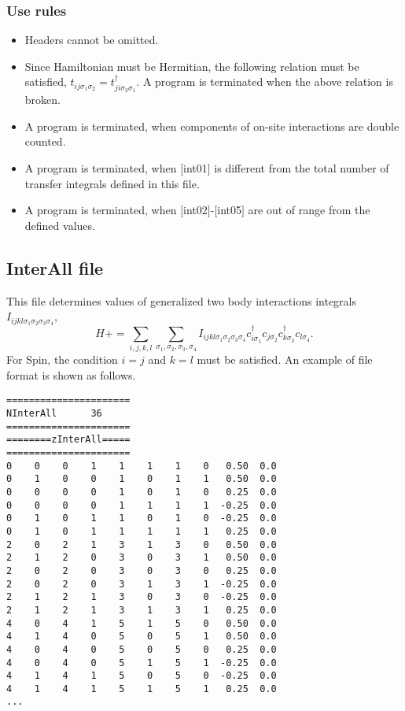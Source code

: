 \subsubsection{Use rules}
\begin{itemize}
\item Headers cannot be omitted. 
\item Since Hamiltonian must be Hermitian, the following relation must be satisfied, $t_{ij\sigma_1\sigma_2}=t_{ji\sigma_2\sigma_1}^{\dagger}$. A program is terminated when the above relation is broken.
\item A program is terminated, when components of on-site interactions are double counted.
\item A program is terminated, when $[$int01$]$ is different from the total number of transfer integrals defined in this file.
\item A program is terminated, when $[$int02$]$-$[$int05$]$ are out of range from the defined values.
\end{itemize}

\newpage
\subsection{InterAll file}
\label{Subsec:interall}
This file determines values of generalized two body interactions integrals $I_{ijkl\sigma_1\sigma_2\sigma_3\sigma_4}$,
\begin{equation}
H+=\sum_{i,j,k,l}\sum_{\sigma_1,\sigma_2, \sigma_3, \sigma_4}
I_{ijkl\sigma_1\sigma_2\sigma_3\sigma_4}c_{i\sigma_1}^{\dagger}c_{j\sigma_2}c_{k\sigma_3}^{\dagger}c_{l\sigma_4}.
\end{equation}
{For Spin, the condition $i=j$ and $k=l$ must be satisfied.}
An example of file format is shown as follows.

\begin{minipage}{12.5cm}
\begin{screen}
\begin{verbatim}
====================== 
NInterAll      36  
====================== 
========zInterAll===== 
====================== 
0    0    0    1    1    1    1    0   0.50  0.0
0    1    0    0    1    0    1    1   0.50  0.0
0    0    0    0    1    0    1    0   0.25  0.0
0    0    0    0    1    1    1    1  -0.25  0.0
0    1    0    1    1    0    1    0  -0.25  0.0
0    1    0    1    1    1    1    1   0.25  0.0
2    0    2    1    3    1    3    0   0.50  0.0
2    1    2    0    3    0    3    1   0.50  0.0
2    0    2    0    3    0    3    0   0.25  0.0
2    0    2    0    3    1    3    1  -0.25  0.0
2    1    2    1    3    0    3    0  -0.25  0.0
2    1    2    1    3    1    3    1   0.25  0.0
4    0    4    1    5    1    5    0   0.50  0.0
4    1    4    0    5    0    5    1   0.50  0.0
4    0    4    0    5    0    5    0   0.25  0.0
4    0    4    0    5    1    5    1  -0.25  0.0
4    1    4    1    5    0    5    0  -0.25  0.0
4    1    4    1    5    1    5    1   0.25  0.0
...
\end{verbatim}
\end{screen}
\end{minipage}

